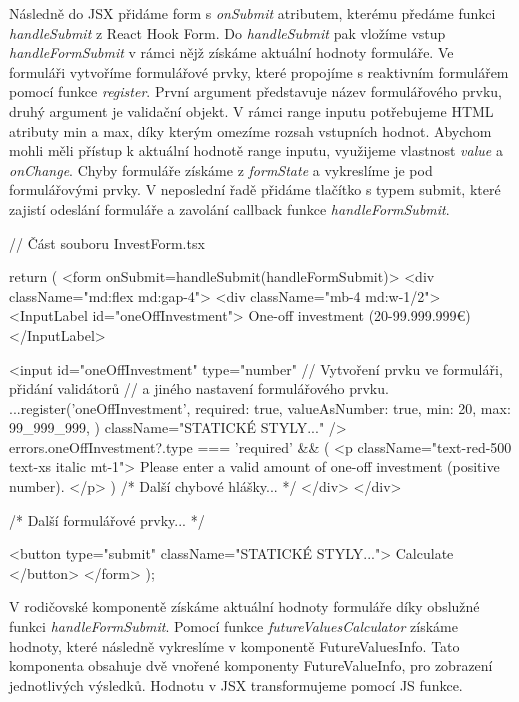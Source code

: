 Následně do JSX přidáme form s \emph{onSubmit} atributem, kterému předáme funkci \emph{handleSubmit} z React Hook Form. Do \emph{handleSubmit} pak vložíme vstup \emph{handleFormSubmit} v rámci nějž získáme aktuální hodnoty formuláře. 
Ve formuláři vytvoříme formulářové prvky, které propojíme s reaktivním formulářem pomocí funkce \emph{register}. První argument představuje název formulářového prvku, druhý argument je validační objekt. 
V rámci range inputu potřebujeme HTML atributy min a max, díky kterým omezíme rozsah vstupních hodnot. Abychom mohli měli přístup k aktuální hodnotě range inputu, využijeme vlastnost \emph{value} a \emph{onChange}. 
Chyby formuláře získáme z \emph{formState} a vykreslíme je pod formulářovými prvky. V neposlední řadě přidáme tlačítko s typem submit, které zajistí odeslání formuláře a zavolání callback funkce \emph{handleFormSubmit}.

\begin{prog}
// Část souboru InvestForm.tsx

return (
  <form onSubmit={handleSubmit(handleFormSubmit)}>
    <div className="md:flex md:gap-4">
      <div className="mb-4 md:w-1/2">
        <InputLabel id="oneOffInvestment">
          One-off investment (20-99.999.999€)
        </InputLabel>

        <input
          id="oneOffInvestment"
          type="number"
          // Vytvoření prvku ve formuláři, přidání validátorů 
          // a jiného nastavení formulářového prvku.
          {...register('oneOffInvestment', {
            required: true,
            valueAsNumber: true,
            min: 20,
            max: 99_999_999,
          })}
          className="STATICKÉ STYLY..."
        />
        {errors.oneOffInvestment?.type === 'required' && (
          <p className="text-red-500 text-xs italic mt-1">
            Please enter a valid amount of one-off investment (positive number).
          </p>
        )}
        {/* Další chybové hlášky... */}
      </div>
    </div>

    {/* Další formulářové prvky... */}

    <button type="submit" className="STATICKÉ STYLY...">
      Calculate
    </button>
  </form>
);
\end{prog}

V rodičovské komponentě získáme aktuální hodnoty formuláře díky obslužné funkci \emph{handleFormSubmit}. Pomocí funkce \emph{futureValuesCalculator} získáme hodnoty, které následně vykreslíme v komponentě FutureValuesInfo. 
Tato komponenta obsahuje dvě vnořené komponenty FutureValueInfo, pro zobrazení jednotlivých výsledků. Hodnotu v JSX transformujeme pomocí JS funkce.

